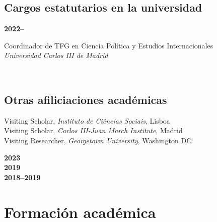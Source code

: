 \documentclass[a4paper, 12pt]{article}
\begin{document}
\vspace{-10pt}
\subsection*{Cargos estatutarios en la universidad}

\noindent
\begin{minipage}[t]{0.12\textwidth}
\textbf{2022--}
\end{minipage}\hfill\begin{minipage}[t]{0.88\textwidth}
Coordinador de TFG en Ciencia Política y Estudios Internacionales\\
\textit{Universidad Carlos III de Madrid}\\\vspace{-8pt}
\end{minipage}\\

\vspace{-10pt}
\subsection*{Otras afiliciaciones académicas}

\noindent
\begin{minipage}[t]{0.82\textwidth}
  Visiting Scholar, \textit{Instituto de Ciências Sociais}, Lisboa\vspace{2pt}\\
  Visiting Scholar, \textit{Carlos III-Juan March Institute}, Madrid\vspace{2pt}\\
	Visiting Researcher, \textit{Georgetown University}, Washington DC
\end{minipage}
\begin{minipage}[t]{0.18\textwidth}
  \flushright
	\textbf{2023}\\\vspace{7pt}
  \textbf{2019}\\\vspace{7pt}
	\textbf{2018--2019}
\end{minipage}

\vspace{-0pt}
\section*{Formación académica}
\end{document}
